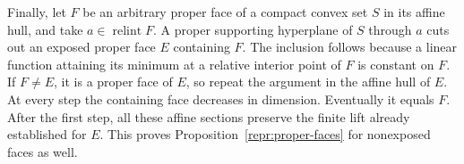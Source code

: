 Finally, let $F$ be an arbitrary proper face of a compact convex set $S$ in
its affine hull, and take $a\in\operatorname{relint}F$. A proper supporting
hyperplane of $S$ through $a$ cuts out an exposed proper face $E$ containing
$F$. The inclusion follows because a linear function attaining its minimum
at a relative interior point of $F$ is constant on $F$. If $F\neq E$, it is
a proper face of $E$, so repeat the argument in the affine hull of $E$.
At every step the containing face decreases in dimension. Eventually it
equals $F$. After the first step, all these affine sections preserve the
finite lift already established for $E$. This proves
Proposition~\ref{repr:proper-faces} for nonexposed faces as well.
